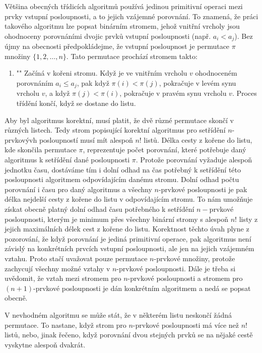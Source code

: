 \documentclass[a4paper,12pt]{article}
\begin{document}
Většina obecných třídicích algoritmů 
používá jedinou primitivní operaci mezi prvky vstupní 
posloupnosti, a to jejich vzá\-jemné porov\-nání.  
To znamená, že práci 
takového algoritmu lze po\-psat 
binárním stro\-mem, jehož vnitřní vrcholy jsou ohodnoceny 
porovnáními dvojic prvků vstupní posloupnosti 
(např. $a_i<a_j$). Bez újmy na obecnosti předpokládejme, že 
vstupní posloupnost je permutace $\pi$
množiny $\{1,2,\dots,n\}$. Tato permutace prochází 
stromem takto:
\begin{enumerate}
\item"{}"
Začíná v kořeni stromu. Když je ve vnitřním vrcholu $
v$ 
ohodnoceném porovnáním $a_i\le a_j$, pak když $\pi (i)
<\pi (j)$, 
pokračuje v levém synu vrcholu $v$, a když $\pi (j)<\pi (
i)$, 
pokračuje v pravém synu vrcholu $v$. Proces 
třídění končí, když se dostane do listu.
\end{enumerate}
Aby byl algoritmus korektní, musí platit, že dvě 
různé permutace skončí v různých 
listech.  Tedy strom popisující korektní algoritmus 
pro setřídění $n$-prvkovývh posloupností musí mít 
alespoň $n!$ listů.  Délka cesty z kořene do listu, 
kde skončila permutace $\pi$, reprezentuje počet porovnání, které potřebuje 
daný algoritmus k setřídění dané posloupnosti $
\pi$. Protože porovnání 
vyžaduje alespoň jednotku času, dostáváme tím i dolní odhad na 
čas potřebný k setřídění této posloupnosti  algoritmem 
odpovídajícím danému stromu. Dolní odhad  počtu 
porovnání i času pro daný algoritmus a všechny  
$n$-prvkové posloupnosti je pak délka nejdelší cesty z kořene 
do listu v odpovídajícím stromu. To nám umožňuje 
získat obecně platný dolní odhad času potřebného k setřídění 
$n-$prvkové posloupnosti, kterým je  
minimum přes všechny binární stromy s alespoň $n!$ 
listy z jejich maximálních délek cest z kořene do listu. 
Korekt\-nost těchto úvah plyne z pozorování, 
že když porovnání je jediná primi\-tivní operace, pak 
algoritmus není závislý na konkrétních prvcích vstup\-ní 
posloupnosti, ale jen na jejich vzájemném vzta\-hu. 
Proto stačí uvažovat pouze permutace $n$-prvkové množiny, 
protože za\-chycují všechny možné vztahy v $n$-prvkové 
posloupnosti. Dá\-le je třeba si uvědomit, že vztah mezi 
stromem pro $n$-prvkové posloupnosti a stromem pro 
$(n+1)$-prvkové posloupnosti je dán konkrétním algoritmem a 
nedá se popsat obecně. 

V nevhodném algoritmu se může stát, že 
v některém listu neskončí žádná permutace. To  
nastane, když strom pro $n$-prvkové posloupnosti má více 
než $n!$ listů, nebo, jinak řečeno, když 
porovnání dvou stejných prvků se na nějaké cestě 
vyskytne alespoň dvakrát. 
\end{document}
